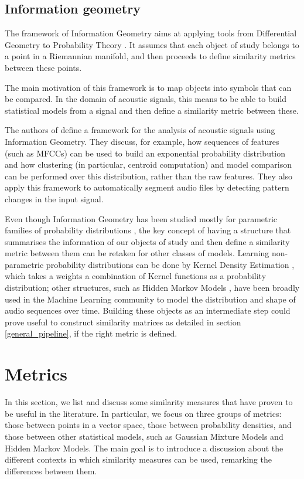 \documentclass[../main.tex]{subfiles}
\begin{document}
\subsection{Information geometry} \label{subsection_infgeom}
The framework of Information Geometry aims at applying tools from Differential Geometry to Probability Theory \cite{Wang2009}. It assumes that each object of study belongs to a point in a Riemannian manifold, and then proceeds to define similarity metrics between these points.
\par The main motivation of this framework is to map objects into symbols that can be compared. In the domain of acoustic signals, this means to be able to build statistical models from a signal and then define a similarity metric between these.
\par The authors of \cite{Cont2011} define a framework for the analysis of acoustic signals using Information Geometry. They discuss, for example, how sequences of features (such as MFCCs) can be used to build an exponential probability distribution and how clustering (in particular, centroid computation) and model comparison can be performed over this distribution, rather than the raw features. They also apply this framework to automatically segment audio files by detecting pattern changes in the input signal.
\par Even though Information Geometry has been studied mostly for parametric families of probability distributions \cite{Amari2001}, the key concept of having a structure that summarises the information of our objects of study and then define a similarity metric between them can be retaken for other classes of models. Learning non-parametric probability distributions can be done by Kernel Density Estimation \cite{Goodall2008}, which takes a weights a combination of Kernel functions as a probability distribution; other structures, such as Hidden Markov Models \cite{Chou2008,Muda2010,Hsieh2009,Wielgat2012}, have been broadly used in the Machine Learning community to model the distribution and shape of audio sequences over time. Building these objects as an intermediate step could prove useful to construct similarity matrices as detailed in section \ref{general_pipeline}, if the right metric is defined.

\section{Metrics}\label{metrics_review}
In this section, we list and discuss some similarity measures that have proven to be useful in the literature. In particular, we focus on three groups of metrics: those between points in a vector space, those between probability densities, and those between other statistical models, such as Gaussian Mixture Models and Hidden Markov Models. The main goal is to introduce a discussion about the different contexts in which similarity measures can be used, remarking the differences between them.
\end{document}
